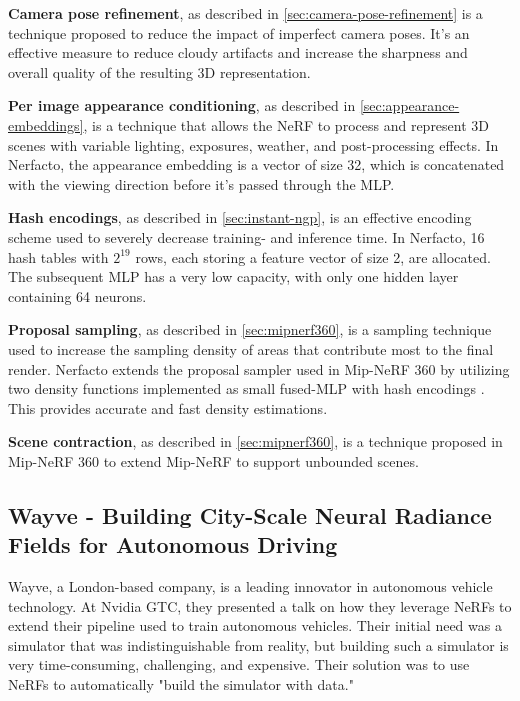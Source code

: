 \textbf{Camera pose refinement}, as described in \autoref{sec:camera-pose-refinement} is a technique proposed to reduce the impact of imperfect camera poses. It's an effective measure to reduce cloudy artifacts and increase the sharpness and overall quality of the resulting 3D representation.

\textbf{Per image appearance conditioning}, as described in \autoref{sec:appearance-embeddings}, is a technique that allows the NeRF to process and represent 3D scenes with variable lighting, exposures, weather, and post-processing effects. In Nerfacto, the appearance embedding is a vector of size 32, which is concatenated with the viewing direction before it's passed through the MLP.

\textbf{Hash encodings}, as described in \autoref{sec:instant-ngp}, is an effective encoding scheme used to severely decrease training- and inference time. In Nerfacto, 16 hash tables with $2^{19}$ rows, each storing a feature vector of size 2, are allocated. The subsequent MLP has a very low capacity, with only one hidden layer containing 64 neurons.

\textbf{Proposal sampling}, as described in \autoref{sec:mipnerf360}, is a sampling technique used to increase the sampling density of areas that contribute most to the final render. Nerfacto extends the proposal sampler used in Mip-NeRF 360 \cite{barron_mip-nerf_2022} by utilizing two density functions implemented as small fused-MLP with hash encodings \cite{muller_instant_2022}. This provides accurate and fast density estimations.

\textbf{Scene contraction}, as described in \autoref{sec:mipnerf360}, is a technique proposed in Mip-NeRF 360 \cite{barron_mip-nerf_2022} to extend Mip-NeRF to support unbounded scenes.

\subsection[Wayve - NeRFs for Autonomous Driving]{Wayve - Building City-Scale Neural Radiance Fields for Autonomous Driving} \label{sec:wayve}
Wayve, a London-based company, is a leading innovator in autonomous vehicle technology. At Nvidia GTC, they presented a talk on how they leverage NeRFs to extend their pipeline used to train autonomous vehicles. Their initial need was a simulator that was indistinguishable from reality, but building such a simulator is very time-consuming, challenging, and expensive. Their solution was to use NeRFs to automatically "build the simulator with data."

